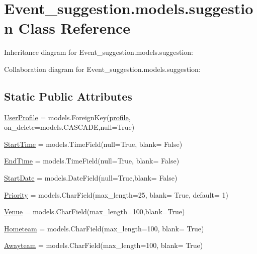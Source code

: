 \hypertarget{classEvent__suggestion_1_1models_1_1suggestion}{}\section{Event\+\_\+suggestion.\+models.\+suggestion Class Reference}
\label{classEvent__suggestion_1_1models_1_1suggestion}


Inheritance diagram for Event\+\_\+suggestion.\+models.\+suggestion\+:


Collaboration diagram for Event\+\_\+suggestion.\+models.\+suggestion\+:
\subsection*{Static Public Attributes}
\begin{DoxyCompactItemize}
\item 
\hyperlink{classEvent__suggestion_1_1models_1_1suggestion_a34732a8136fe27e916a4934316defe02}{User\+Profile} = models.\+Foreign\+Key(\hyperlink{classprofiles_1_1models_1_1profile}{profile}, on\+\_\+delete=models.\+C\+A\+S\+C\+A\+DE,null=True)
\item 
\hyperlink{classEvent__suggestion_1_1models_1_1suggestion_a076480c48f595075b949897a12db263e}{Start\+Time} = models.\+Time\+Field(null=True, blank= False)
\item 
\hyperlink{classEvent__suggestion_1_1models_1_1suggestion_a8591442e0fecda31d17c219cd29fac77}{End\+Time} = models.\+Time\+Field(null=True, blank= False)
\item 
\hyperlink{classEvent__suggestion_1_1models_1_1suggestion_a37a303d9f70fe68d539e874d98264d8e}{Start\+Date} = models.\+Date\+Field(null=True,blank= False)
\item 
\hyperlink{classEvent__suggestion_1_1models_1_1suggestion_a3bcf2e84c25ad2c81f42731e6d45db56}{Priority} = models.\+Char\+Field(max\+\_\+length=25, blank= True, default= \textquotesingle{}1\textquotesingle{})
\item 
\hyperlink{classEvent__suggestion_1_1models_1_1suggestion_ac58ac02dd8e5811f0b21ff58ffc4954d}{Venue} = models.\+Char\+Field(max\+\_\+length=100,blank=True)
\item 
\hyperlink{classEvent__suggestion_1_1models_1_1suggestion_a996e86e4198607a336d5929f66068cb9}{Hometeam} = models.\+Char\+Field(max\+\_\+length=100, blank= True)
\item 
\hyperlink{classEvent__suggestion_1_1models_1_1suggestion_ae11bf44f5a07ea984d0f203e4940c660}{Awayteam} = models.\+Char\+Field(max\+\_\+length=100, blank= True)
\end{DoxyCompactItemize}


